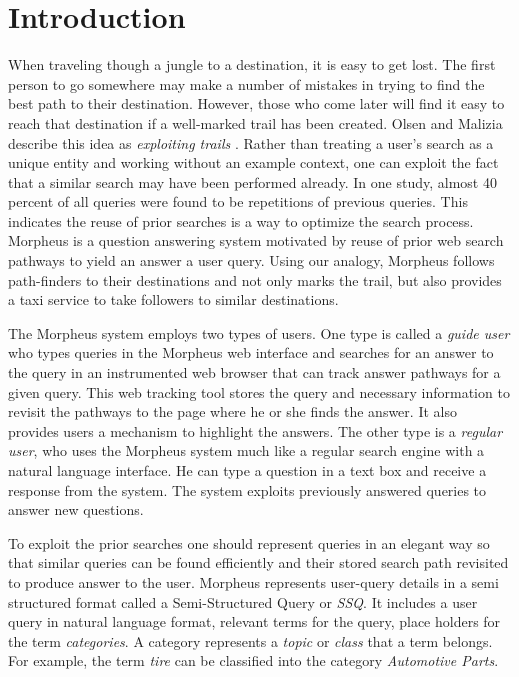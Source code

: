 \section{Introduction}



When traveling though a jungle to a destination, it is easy to get
lost.  The first person to go somewhere may make a number of mistakes
in trying to find the best path to their destination.  However, those
who come later will find it easy to reach that destination if a
well-marked trail has been created. Olsen and Malizia describe this
idea as \emph{exploiting trails} \cite{5379671}.  Rather than treating
a user's search as a unique entity and working without an example
context, one can exploit the fact that a similar search may have been
performed already.  In one study, almost 40 percent of all queries
were found to be repetitions of previous queries\cite{1277770}. This
indicates the reuse of prior searches is a way to optimize the search
process.  Morpheus is a question answering system motivated by reuse of prior web search pathways to yield an answer a user query. Using our analogy, Morpheus  follows path-finders to their destinations and not only marks the trail, but also provides a taxi service to take followers to similar destinations.

The Morpheus system employs two types of users. One type is called a
\textit{guide user} who types queries in the Morpheus web interface and
searches for an answer to the query in an instrumented web browser that can
track answer pathways for a given query. This web tracking tool stores the query
and necessary information to revisit the pathways to the page where he or she
finds the answer. It also provides users a mechanism to highlight the answers.
The other type is a \textit{regular user}, who uses the Morpheus system much
like a regular search engine with a natural language interface. He can type a
question in a text box and receive a response from the system. The system
exploits previously answered queries to answer new questions.

To exploit the prior searches one should represent queries in an elegant way so
that similar queries can be found efficiently and their stored search path
revisited to produce answer to the user. Morpheus represents user-query details in a semi structured format called a Semi-Structured Query or \textit{SSQ}. It includes a user query in natural language format, relevant terms for the query, place holders for the term \textit{categories}. A category represents a \textit{topic} or \textit{class} that a term belongs. For example, the term \textit{tire} can be classified into the category \textit{Automotive Parts}. 

